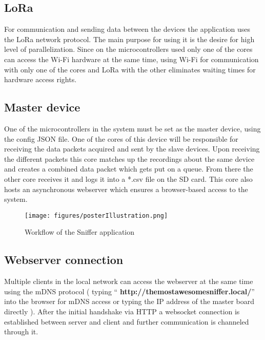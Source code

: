 \documentclass[11pt,a4paper]{article}
\begin{document}
\subsection{LoRa}
For communication and sending data between the devices the application uses the LoRa network protocol. The main purpose for using it is the desire for high level of parallelization. Since on the microcontrollers used only one of the cores can access the Wi-Fi hardware at the same time, using Wi-Fi for communication with only one of the cores and LoRa with the other eliminates waiting times for hardware access rights.

\subsection{Master device}
One of the microcontrollers in the system must be set as the master device, using the config JSON file. One of the cores of this device will be responsible for receiving the data packets acquired and sent by the slave devices. Upon receiving the different packets this core matches up the recordings about the same device and creates a combined data packet which gets put on a queue. From there the other core receives it and logs it into a *.csv file on the SD card. This core also hosts an asynchronous webserver which ensures a browser-based access to the system.\\[1cm]

\begin{figure}[H]
    \centering
    \texttt{[image: figures/posterIllustration.png]}
    \caption{Workflow of the Sniffer application}
    \label{fig:workflow}
\end{figure}

\onecolumn

\subsection{Webserver connection}
Multiple clients in the local network can access the webserver at the same time using the mDNS protocol ( typing ``{\selectfont
\textbf{http://themostawesomesniffer.local/}}'' into the browser for mDNS access or typing the IP address of the master board directly ). After the initial handshake via HTTP a websocket connection is established between server and client and further communication is channeled through it. 
\end{document}
